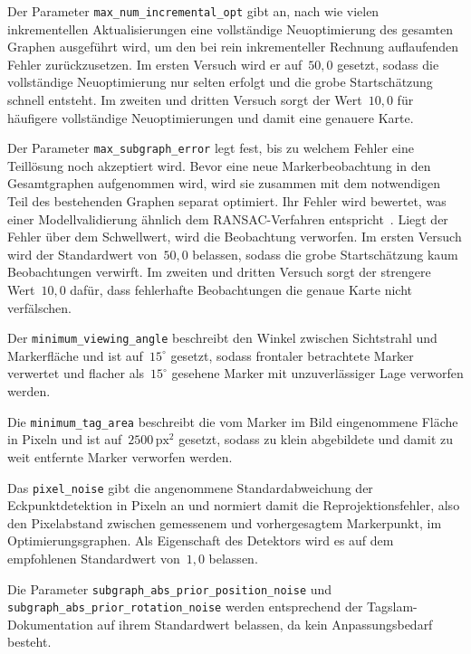 Der Parameter \texttt{max\_num\_incremental\_opt} gibt an, 
nach wie vielen inkrementellen Aktualisierungen eine vollständige Neuoptimierung des gesamten Graphen ausgeführt wird, 
um den bei rein inkrementeller Rechnung auflaufenden Fehler zurückzusetzen.
Im ersten Versuch wird er auf~$50{,}0$ gesetzt, sodass die vollständige Neuoptimierung nur selten erfolgt und die grobe Startschätzung schnell entsteht.
Im zweiten und dritten Versuch sorgt der Wert~$10{,}0$ für häufigere vollständige Neuoptimierungen und damit eine genauere Karte.

Der Parameter \texttt{max\_subgraph\_error} legt fest, bis zu welchem Fehler eine Teillösung noch akzeptiert wird.
Bevor eine neue Markerbeobachtung in den Gesamtgraphen aufgenommen wird, wird sie zusammen mit dem notwendigen Teil des bestehenden Graphen separat optimiert.
Ihr Fehler wird bewertet, was einer Modellvalidierung ähnlich dem RANSAC-Verfahren entspricht~\cite{pfrommer2019tagslam}.
Liegt der Fehler über dem Schwellwert, wird die Beobachtung verworfen.
Im ersten Versuch wird der Standardwert von~$50{,}0$ belassen, sodass die grobe Startschätzung kaum Beobachtungen verwirft.
Im zweiten und dritten Versuch sorgt der strengere Wert~$10{,}0$ dafür, dass fehlerhafte Beobachtungen die genaue Karte nicht verfälschen.

Der \texttt{minimum\_viewing\_angle} beschreibt den Winkel zwischen Sichtstrahl und Markerfläche und ist auf~$15^\circ$ gesetzt, 
sodass frontaler betrachtete Marker verwertet und flacher als~$15^\circ$ gesehene Marker mit unzuverlässiger Lage verworfen werden.

Die \texttt{minimum\_tag\_area} beschreibt die vom Marker im Bild eingenommene Fläche in Pixeln und ist auf~$2500\,\text{px}^2$ gesetzt, 
sodass zu klein abgebildete und damit zu weit entfernte Marker verworfen werden.

Das \texttt{pixel\_noise} gibt die angenommene Standardabweichung der Eckpunktdetektion in Pixeln an und normiert damit die Reprojektionsfehler, 
also den Pixelabstand zwischen gemessenem und vorhergesagtem Markerpunkt, im Optimierungsgraphen.
Als Eigenschaft des Detektors wird es auf dem empfohlenen Standardwert von~$1{,}0$ belassen.

Die Parameter \texttt{subgraph\_\allowbreak abs\_\allowbreak prior\_\allowbreak position\_\allowbreak noise} und \texttt{subgraph\_\allowbreak abs\_\allowbreak prior\_\allowbreak rotation\_\allowbreak noise} 
werden entsprechend der Tag\gls{slam}-Dokumentation auf ihrem Standardwert belassen, da kein Anpassungsbedarf besteht.

